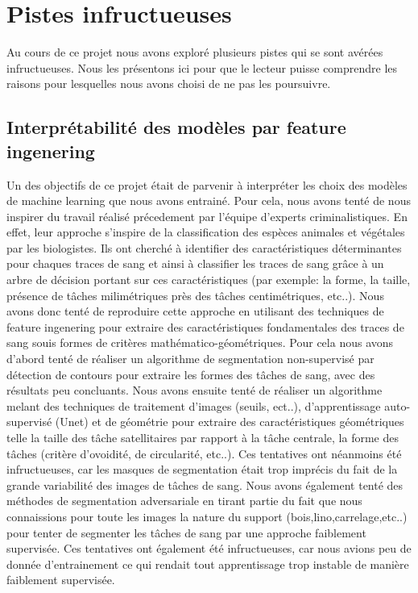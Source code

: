 

\section{Pistes infructueuses}

Au cours de ce projet nous avons exploré plusieurs pistes qui se sont avérées infructueuses. Nous les présentons ici pour que le lecteur puisse comprendre les raisons pour lesquelles nous avons choisi de ne pas les poursuivre.

\subsection{Interprétabilité des modèles par feature ingenering}

Un des objectifs de ce projet était de parvenir à interpréter les choix des modèles de machine learning que nous avons entrainé.
Pour cela, nous avons tenté de nous inspirer du travail réalisé précedement par l'équipe d'experts criminalistiques. En effet,
leur approche s'inspire de la classification des espèces animales et végétales par les biologistes. Ils ont cherché à identifier des caractéristiques
déterminantes pour chaques traces de sang et ainsi à classifier les traces de sang grâce à un arbre de décision
portant sur ces caractéristiques (par exemple: la forme, la taille, présence de tâches milimétriques près des tâches centimétriques, etc..).
Nous avons donc tenté de reproduire cette approche en utilisant des techniques de feature ingenering pour extraire des caractéristiques
fondamentales des traces de sang souis formes de critères mathématico-géométriques. Pour cela nous avons d'abord tenté de réaliser
un algorithme de segmentation non-supervisé par détection de contours pour extraire les formes des tâches de sang, avec des résultats peu concluants. Nous avons ensuite
tenté de réaliser un algorithme melant des techniques de traitement d'images (seuils, ect..), d'apprentissage auto-supervisé (Unet) et de géométrie pour extraire des caractéristiques géométriques telle la taille
des tâche satellitaires par rapport à la tâche centrale, la forme des tâches (critère d'ovoidité, de circularité, etc..). Ces tentatives ont néanmoins
été infructueuses, car les masques de segmentation était trop imprécis du fait de la grande variabilité des images de tâches de sang. Nous avons également tenté des méthodes de segmentation
adversariale en tirant partie du fait que nous connaissions pour toute les images la nature du support (bois,lino,carrelage,etc..) pour tenter de segmenter les tâches de sang par une approche faiblement supervisée. Ces tentatives ont également été infructueuses, car nous 
avions peu de donnée d'entrainement ce qui rendait tout apprentissage trop instable de manière faiblement supervisée.

